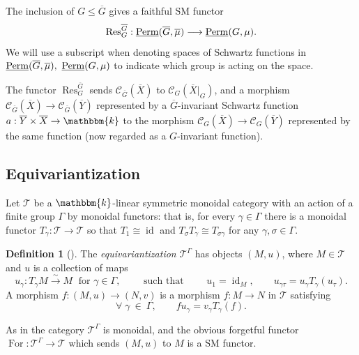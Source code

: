 \documentclass[11pt,a4paper]{amsart}
\theoremstyle{plain}%
\theoremstyle{definition}
\newtheorem{definition}[lemma]{Definition}
\theoremstyle{remark}
\newcommand{\id}{\operatorname{id}}
\newcommand{\Perm}{\underline{{\rm Perm}}}
\newcommand{\kk}{\mathbbm{k}}
\newcommand{\oG}{{\overline{G}}}
\newcommand{\oX}{{\overline{X}}}
\newcommand{\For}{\operatorname{For}}
\begin{document}
The inclusion of $G \leq \oG$  gives a faithful SM functor
\[
 \operatorname{Res}^{\oG}_{G}:\Perm(\oG,\overline{\mu})\longrightarrow\Perm(G,\mu).
\]
We will use a subscript when denoting spaces of Schwartz functions in $\Perm(\oG,\overline{\mu}),~\Perm(G,\mu)$ to indicate which group is acting on the space.

The functor $\operatorname{Res}^{\oG}_{G}$ sends $\mathcal C_{\oG}(\oX)$ to $\mathcal C_{G}(\oX|_{G})$, and a morphism $\mathcal C_{\oG}(\oX)\to \mathcal C_{\oG}(\overline{Y}) $ represented by a $\oG$-invariant Schwartz function $a:\overline{Y}\times \oX\to\kk$ to the morphism $\mathcal C_{G}(\oX)\to \mathcal C_{G}(\overline{Y}) $ represented by the same function (now regarded as a $G$-invariant function). 

\subsection{Equivariantization}


\medskip

Let $\mathcal T$ be a $\kk$-linear symmetric monoidal category with an action of a finite group $\Gamma$ by monoidal functors: that is, for every $\gamma\in \Gamma$ there is a monoidal functor $T_{\gamma}:\mathcal T\to \mathcal T$ so that $T_1\cong \id $ and $T_\sigma T_\gamma \cong T_{\sigma \gamma} $ for any $\gamma, \sigma \in \Gamma$.
\begin{definition}[{\cite[Definition~2.7.2]{EGNO}}]\label{def:equivariantization}
The \emph{equivariantization} $\mathcal T^{\Gamma}$ has objects $(M,u)$, where $M\in\mathcal T$ and $u$
is a collection of maps \[
 u_\gamma:T_\gamma M\xrightarrow{\sim}M\; \text{ for } \gamma \in \Gamma, \qquad \text{ such that } \qquad
 u_1=\id_M,\qquad u_{\gamma\tau}=u_\gamma T_\gamma(u_\tau).
\]
A morphism $f:(M,u)\to(N,v)$ is a morphism $f:M\to N$ in $\mathcal T$ satisfying
\[\forall \; \gamma~ \in ~\Gamma, \qquad
 f u_\gamma=v_\gamma T_\gamma(f).
\]
\end{definition}

As in \cite[Definition~2.7.2]{EGNO} the category $\mathcal T^{\Gamma}$ is monoidal, and the obvious forgetful functor $\For:\mathcal T^{\Gamma}\to\mathcal T$ which sends $(M,u)$ to $M$ is a SM functor.
\end{document}
